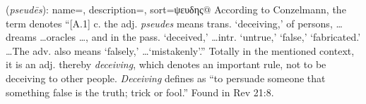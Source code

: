 \item[Deceiving,]

(\textit{pseudēs}):
{
    name=,
    description={},
    sort=ψευδης@
}
According to Conzelmann, the term denotes ``[A.1] c. the adj. \emph{pseudes} means trans. `deceiving,' of persons, \ldots dreams \ldots oracles \ldots, and in the pass. `deceived,' \ldots intr. `untrue,' `false,' `fabricated.' \ldots The adv. also means `falsely,' \ldots `mistakenly'.'' Totally in the mentioned context, it is an adj. thereby \emph{deceiving}, which denotes an important rule, not to be deceiving to other people. \emph{Deceiving} defines as ``to persuade someone that something false is the truth; trick or fool.''
Found in Rev 21:8.
